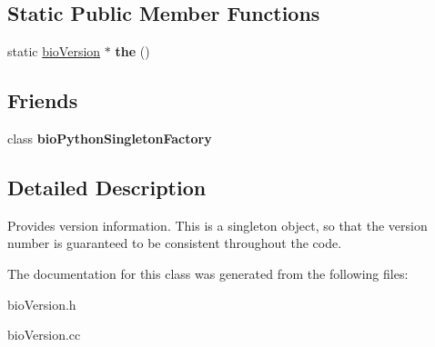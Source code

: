\subsection*{Static Public Member Functions}
\begin{DoxyCompactItemize}
\item 
\mbox{\label{classbio_version_a19e850a2b898ff6017c060d46b436b1b}} 
static \hyperlink{classbio_version}{bio\+Version} $\ast$ {\bfseries the} ()
\end{DoxyCompactItemize}
\subsection*{Friends}
\begin{DoxyCompactItemize}
\item 
\mbox{\label{classbio_version_a7112c3c569ac638826c63fda15012746}} 
class {\bfseries bio\+Python\+Singleton\+Factory}
\end{DoxyCompactItemize}


\subsection{Detailed Description}
Provides version information. This is a singleton object, so that the version number is guaranteed to be consistent throughout the code. 

The documentation for this class was generated from the following files\+:\begin{DoxyCompactItemize}
\item 
bio\+Version.\+h\item 
bio\+Version.\+cc\end{DoxyCompactItemize}
